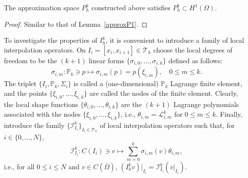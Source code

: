 \begin{lemma}
    The approximation space $P_h^k$ constructed above satisfies $P_h^k \subset H^1(\Omega)$.
\begin{proof}
    Similar to that of Lemma~\ref{approxP1}.
\end{proof}
\end{lemma}
To investigate the properties of $I_h^k$, it is convenient to introduce a family of local interpolation operators. On $I_i = [x_i, x_{i+1}] \in \mathcal{T}_h$ choose the local degrees of freedom to be the $(k+1)$ linear forms $\{\sigma_{i,0}, \dots, \sigma_{i,k}\}$ defined as follows:
\begin{equation*}
\sigma_{i,m}: \mathbb{P}_k \ni p \mapsto \sigma_{i,m}(p) = p(\xi_{i,m}), \quad 0 \le m \le k.
\end{equation*}
The triplet $\{I_i, \mathbb{P}_k, \Sigma_i\}$ is called a (one-dimensional) $\mathbb{P}_k$ Lagrange finite element, and the points $\{\xi_{i,0}, \dots, \xi_{i,k}\}$ are called the nodes of the finite element. Clearly, the local shape functions $\{\theta_{i,0}, \dots, \theta_{i,k}\}$ are the $(k+1)$ Lagrange polynomials associated with the nodes $\{\xi_{i,0}, \dots, \xi_{i,k}\}$, i.e., $\theta_{i,m} = \mathcal{L}_{i,m}^k$ for $0 \le m \le k$. Finally, introduce the family $\{\mathcal{I}_{I_i}^k\}_{I_i \in \mathcal{T}_h}$ of local interpolation operators such that, for $i \in \{0, \dots, N\}$,
\begin{equation*}
\mathcal{I}_{I_i}^k: C(I_i) \ni v \mapsto \sum_{m=0}^k \sigma_{i,m}(v) \theta_{i,m},
\end{equation*}
i.e., for all $0 \le i \le N$ and $v \in C(\bar{\Omega})$, $(I_h^k v)|_{I_i} = \mathcal{I}_{I_i}^k(v|_{I_i})$.

